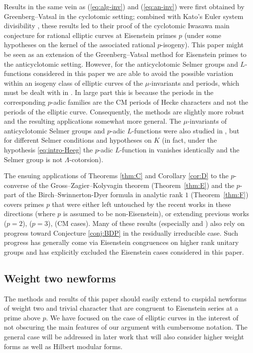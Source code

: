 \documentclass[10pt]{amsart}
\numberwithin{equation}{section}
\theoremstyle{definition}
\theoremstyle{remark}
\begin{document}
Results in the same vein as (\ref{eq:alg-inv}) and (\ref{eq:an-inv}) were first obtained by Greenberg--Vatsal \cite{greenvats} in the cyclotomic setting; combined with Kato's Euler system divisibility \cite{kato-euler-systems}, these results led to their proof of the cyclotomic Iwasawa main conjecture for rational elliptic curves at Eisenstein primes $p$ (under some hypotheses on the kernel of the associated rational $p$-isogeny). This paper might be seen as an extension of the Greenberg--Vatsal method for Eisenstein primes to the anticyclotomic setting.  
{However, for the anticyclotomic Selmer groups and $L$-functions considered in this paper we are able to avoid the possible variation within an isogeny class of elliptic curves of the $\mu$-invariants and periods, which must be dealt with in \cite{greenvats}. In large part this is because the periods
in the corresponding $p$-adic families are the CM periods of Hecke characters and not the periods of the elliptic curve.  Consequently, the methods are slightly more robust and the resulting applications somewhat more general. 
The $\mu$-invariants of anticyclotomic Selmer groups and $p$-adic $L$-functions were also studied in \cite{pollack2011anticyclotomic}, but for different Selmer conditions and hypotheses on $K$ (in fact, under the hypothesis \eqref{eq:intro-Heeg} the $p$-adic $L$-function in \cite{pollack2011anticyclotomic} vanishes identically and the Selmer group is not $\Lambda$-cotorsion).}


The ensuing applications {of Theorems \ref{thm:C} and Corollary \ref{cor:D}} to the $p$-converse of the Gross--Zagier--Kolyvagin theorem (Theorem~\ref{thm:E}) and the $p$-part of the Birch--Swinnerton-Dyer formula in analytic rank $1$ (Theorem~\ref{thm:F}) covers primes $p$ that were either left untouched by the recent works in these directions \cite{pCONVskinner,pCONVvenerucci,pBSDbert,wei-zhang,skinner-zhang,jsw,castella,pBSDbps} (where $p$ is assumed to be non-Eisenstein), or extending previous works \cite{tian,CLTZ,CCL} ($p=2$),  \cite{kriz-li} ($p=3$), \cite{CMpconverse} (CM cases). {Many of these results (especially \cite{pCONVskinner} and \cite{jsw}) also rely on progress toward 
 Conjecture \ref{conj:BDP} in the residually irreducible case. Such progress has generally come via Eisenstein congruences on higher rank unitary groups and has explicitly excluded the Eisenstein cases considered in this paper.}


\subsection{Weight two newforms} The methods and results of this paper should easily extend to cuspidal newforms of weight two and trivial character that are congruent to Eisenstein series at a prime above $p$. We have focused on the case of elliptic curves in the interest of not obscuring the main features of our argument with cumbersome notation. The general case will be addressed in later work that will also consider higher weight forms as well as Hilbert modular forms.
\end{document}
